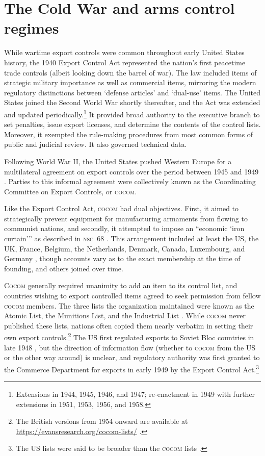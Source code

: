 \documentclass[12pt]{olfmemo}
\begin{document}
\section{The Cold War and arms control regimes}\label{sec:coldwar}
While wartime export controls were common throughout early United States history, the 1940 Export Control Act represented the nation's first peacetime trade controls (albeit looking down the barrel of war). The law included items of strategic military importance as well as commercial items, mirroring the modern regulatory distinctions between `defense articles' and `dual-use' items. The United States joined the Second World War shortly thereafter, and the Act was extended and updated periodically.\footnote{Extensions in 1944, 1945, 1946, and 1947; re-enactment in 1949 with further extensions in 1951, 1953, 1956, and 1958.} It provided broad authority to the executive branch to set penalties, issue export licenses, and determine the contents of the control lists. Moreover, it exempted the rule-making procedures from most common forms of public and judicial review. It also governed technical data. \citep{NAP1987}

Following World War II, the United States pushed Western Europe for a multilateral agreement on export controls over the period between 1945 and 1949 \citep{Yasuhara1991}. Parties to this informal agreement were collectively known as the Coordinating Committee on Export Controls, or \textsc{cocom}.

Like the Export Control Act, \textsc{cocom} had dual objectives. First, it aimed to strategically prevent equipment for manufacturing armaments from flowing to communist nations, and secondly, it attempted to impose an ``economic `iron curtain''' as described in \textsc{nsc}~68 \citep{NSC68}. This arrangement included at least the US, the UK, France, Belgium, the Netherlands, Denmark, Canada, Luxembourg, and Germany \citep{Yasuhara1991}, though accounts vary as to the exact membership at the time of founding, and others joined over time.

\textsc{Cocom} generally required unanimity to add an item to its control list, and countries wishing to export controlled items agreed to seek permission from fellow \textsc{cocom} members. The three lists the organization maintained were known as the Atomic List, the Munitions List, and the Industrial List \citep{Evans2014}. While \textsc{cocom} never published these lists, nations often copied them nearly verbatim in setting their own export controls.\footnote{The British versions from 1954 onward are available at \url{https://evansresearch.org/cocom-lists/} \citep{Evans2015}.} The US first regulated exports to Soviet Bloc countries in late 1948 \citep{Aoi2016}, but the direction of information flow (whether to \textsc{cocom} from the US or the other way around) is unclear, and regulatory authority was first granted to the Commerce Department for exports in early 1949 by the Export Control Act.\footnote{The US lists were said to be broader than the \textsc{cocom} lists \citep{NAP1987}.} %
\end{document}
